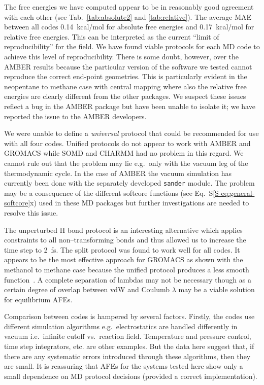 \documentclass[journal=jctcce,manuscript=article]{achemso}
\newcommand{\progname}[1]{\texttt{#1}}
\begin{document}
The free energies we have computed appear to be in reasonably good agreement with each other (see Tab.~\ref{tab:absolute2} and \ref{tab:relative}).  The average MAE between all codes \SI{0.14}{kcal/mol} for absolute free energies and \SI{0.17}{kcal/mol} for relative free energies.  This can be interpreted as the current ``limit of reproducibility'' for the field.  We have found viable protocols for each MD code to achieve
this level of reproducibility.  There is some doubt, however, over the AMBER
results because the particular version of the software we tested  cannot reproduce the correct end-point
geometries.  This is particularly evident in the neopentane to methane case
with central mapping where also the relative free energies are clearly
different from the other packages.  We suspect these issues reflect a bug in
the AMBER package but have been unable to isolate it; we have reported the
issue to the AMBER developers.

We were unable to define  a \emph{universal} protocol that could be recommended for use with all four codes.  Unified protocols do not appear to work with AMBER and GROMACS while SOMD and CHARMM had no problem in this regard.  We cannot rule out that the problem may lie e.g.\ only with the
vacuum leg of the thermodynamic cycle.  In the case of AMBER the vacuum simulation has currently been done with the separately developed \progname{sander} module.  The problem may be a consequence of the different softcore functions (see Eq.~S\ref{S-eq:general-softcore}x) used in these MD packages but further investigations are needed to resolve this issue.

The unperturbed H bond protocol is an interesting alternative which
applies constraints to all non--transforming bonds and thus allowed us
to increase the time step to \SI{2}{fs}.  The split protocol was found
to work well for all codes.  It appears to be the most effective
approach for GROMACS as shown with the methanol to methane case
because the unified protocol produces a less smooth
function~\cite{shirts_chapter_2007}.  A complete separation of lambdas
may not be necessary though as a certain degree of overlap between vdW
and Coulumb $\lambda$ may be a viable
solution~\cite{procacci_fast_2014} for equilibrium AFEs.

Comparison between codes is hampered by several factors.  Firstly, the codes use different simulation algorithms e.g.\
electrostatics are handled differently in vacuum i.e.\ infinite cutoff vs.\
reaction field.  Temperature and pressure control, time step integrators, etc. are other examples.  But the data here suggest that, if there are any systematic errors introduced through these algorithms, then they are small.  It is reassuring that AFEs for the systems tested here show only a small dependence on MD protocol decisions (provided a correct implementation).
\end{document}

